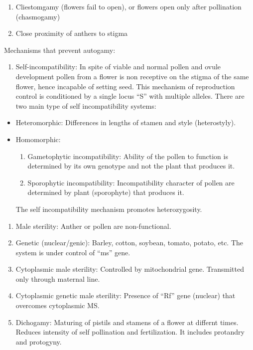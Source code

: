 \documentclass[
  openany]{book}
\providecommand{\tightlist}{%
  \setlength{\itemsep}{0pt}\setlength{\parskip}{0pt}}
\begin{document}
\begin{enumerate}
\def\labelenumi{\arabic{enumi}.}
\tightlist
\item
  Cliestomgamy (flowers fail to open), or flowers open only after pollination (chasmogamy)
\item
  Close proximity of anthers to stigma
\end{enumerate}

Mechanisms that prevent autogamy:

\begin{enumerate}
\def\labelenumi{\arabic{enumi}.}
\tightlist
\item
  Self-incompatibility: In spite of viable and normal pollen and ovule development pollen from a flower is non receptive on the stigma of the same flower, hence incapable of setting seed. This mechanism of reproduction control is conditioned by a single locus ``S'' with multiple alleles. There are two main type of self incompatibility systems:
\end{enumerate}

\begin{itemize}
\tightlist
\item
  Heteromorphic: Differences in lengths of stamen and style (heterostyly).
\item
  Homomorphic:

  \begin{enumerate}
  \def\labelenumi{\arabic{enumi}.}
  \tightlist
  \item
    Gametophytic incompatibility: Ability of the pollen to function is determined by its own genotype and not the plant that produces it.
  \item
    Sporophytic incompatibility: Incompatibility character of pollen are determined by plant (sporophyte) that produces it.
  \end{enumerate}

  The self incompatibility mechanism promotes heterozygosity.
\end{itemize}

\begin{enumerate}
\def\labelenumi{\arabic{enumi}.}
\setcounter{enumi}{1}
\item
  Male sterility: Anther or pollen are non-functional.
\item
  Genetic (nuclear/genic): Barley, cotton, soybean, tomato, potato, etc. The system is under control of ``ms'' gene.
\item
  Cytoplasmic male sterility: Controlled by mitochondrial gene. Transmitted only through maternal line.
\item
  Cytoplasmic genetic male sterility: Presence of ``Rf'' gene (nuclear) that overcomes cytoplasmic MS.
\item
  Dichogamy: Maturing of pistils and stamens of a flower at differnt times. Reduces intensity of self pollination and fertilization. It includes protandry and protogyny.
\end{enumerate}
\end{document}

